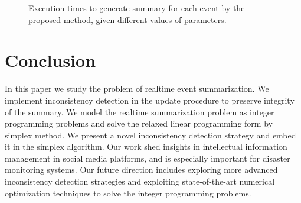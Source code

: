 \documentclass[envcountsame]{llncs}
\begin{document}
\vspace{-0.5cm}
\begin{figure}
  \centering
{}
\hspace{-4ex}
\setlength{\abovecaptionskip}{-0.1cm}
\caption{Execution times to generate summary for each event by the proposed method, given different values of parameters.}
\end{figure}
\vspace{-0.5cm}

\section{Conclusion}\label{sec:conclusion}
 In this paper we study the problem of realtime event summarization. We implement inconsistency detection in the update procedure to preserve integrity of the summary. We model the realtime summarization problem as integer programming problems and solve the relaxed linear programming form by simplex method. We present a novel inconsistency detection strategy and embed it in the simplex algorithm. Our work shed insights in intellectual information management in social media platforms, and is especially important for disaster monitoring systems. Our future direction includes exploring more advanced inconsistency detection strategies and exploiting state-of-the-art numerical optimization techniques to solve the integer programming problems.
\end{document}
